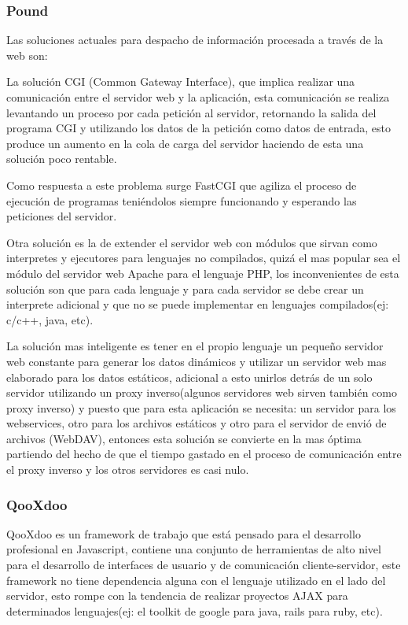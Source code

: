 \subsubsection*{Pound \cite{pound} }
\label{tec:pound}

Las soluciones actuales para despacho de información procesada a través de la web son:

La solución CGI (Common Gateway Interface), que implica realizar una comunicación entre el servidor web y la aplicación, esta comunicación se realiza levantando un proceso por cada petición al servidor, retornando la salida del programa CGI y utilizando los datos de la petición como datos de entrada, esto produce un aumento en la cola de carga del servidor haciendo de esta una solución poco rentable.

Como respuesta a este problema surge FastCGI que agiliza el proceso de ejecución de programas teniéndolos siempre funcionando y esperando las peticiones del servidor.

Otra solución es la de extender el servidor web con módulos que sirvan como interpretes y ejecutores para lenguajes no compilados, quizá el mas popular sea el módulo del servidor web Apache para el lenguaje PHP, los inconvenientes de esta solución son que para cada lenguaje y para cada servidor se debe crear un interprete adicional y que no se puede implementar en lenguajes compilados(ej: c/c++, java, etc).

La solución mas inteligente es tener en el propio lenguaje un pequeño servidor web constante para generar los datos dinámicos y utilizar un servidor web mas elaborado para los datos estáticos, adicional a esto unirlos detrás de un solo servidor utilizando un proxy inverso(algunos servidores web sirven también como proxy inverso) y puesto que para esta aplicación se necesita: un servidor para los webservices, otro para los archivos estáticos y otro para el servidor de envió de archivos (WebDAV), entonces esta solución se convierte en la mas óptima partiendo del hecho de que el tiempo gastado en el proceso de comunicación entre el proxy inverso y los otros servidores es casi nulo.


\subsubsection*{QooXdoo \cite{qooxdoo} }
\label{tec:qooxdoo}

QooXdoo es un framework de trabajo que está pensado para el desarrollo profesional en Javascript, contiene una conjunto de herramientas de alto nivel para el desarrollo de interfaces de usuario y de comunicación cliente-servidor, este framework no tiene dependencia alguna con el lenguaje utilizado en el lado del servidor, esto rompe con la tendencia de realizar proyectos AJAX para determinados lenguajes(ej: el toolkit de google para java, rails para ruby, etc).

